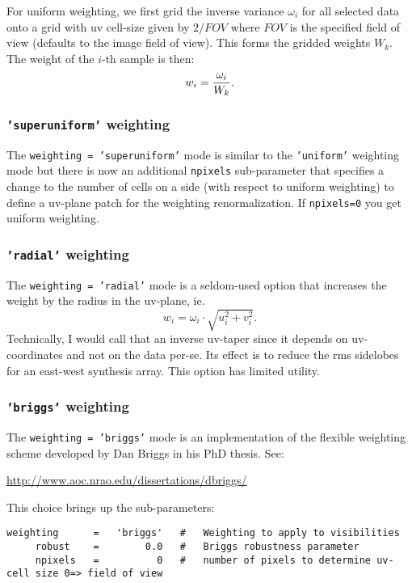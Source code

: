 For uniform weighting, we first grid the inverse variance $\omega_i$
for all selected data onto a grid with uv cell-size given by $2/FOV$
where $FOV$ is the specified field of view (defaults to the image
field of view).  This forms the gridded weights $W_k$. The weight of
the $i$-th sample is then: 
\begin{equation}
  w_i = {\omega_i \over W_k}.
\end{equation}

\subsubsection{{\tt 'superuniform'} weighting }
\label{section:im.pars.weighting.superuniform}

The {\tt weighting = 'superuniform'} mode is similar to the
{\tt 'uniform'} weighting mode but there is now an additional
{\tt npixels} sub-parameter that specifies a change to the number of 
cells on a side (with respect to uniform weighting) to define a
uv-plane patch for the weighting renormalization.  
If {\tt npixels=0} you get uniform weighting.

\subsubsection{{\tt 'radial'} weighting }
\label{section:im.pars.weighting.radial}

The {\tt weighting = 'radial'} mode is a seldom-used option that
increases the weight by the radius in the uv-plane, ie.
\begin{equation}
  w_i = \omega_i \cdot \sqrt{u^2_i + v^2_i}.
\end{equation}
Technically, I would call that an inverse uv-taper since it depends on
uv-coordinates and not on the data per-se.
Its effect is to reduce the rms sidelobes for an east-west synthesis
array.  This option has limited utility.

\subsubsection{{\tt 'briggs'} weighting }
\label{section:im.pars.weighting.briggs}

The {\tt weighting = 'briggs'} mode is an implementation of the
flexible weighting scheme developed by Dan Briggs in his PhD thesis.
See:

\url{http://www.aoc.nrao.edu/dissertations/dbriggs/}

This choice brings up the sub-parameters:
\small
\begin{verbatim}
weighting      =   'briggs'   #   Weighting to apply to visibilities 
     robust    =        0.0   #   Briggs robustness parameter
     npixels   =          0   #   number of pixels to determine uv-cell size 0=> field of view
\end{verbatim}
\normalsize

